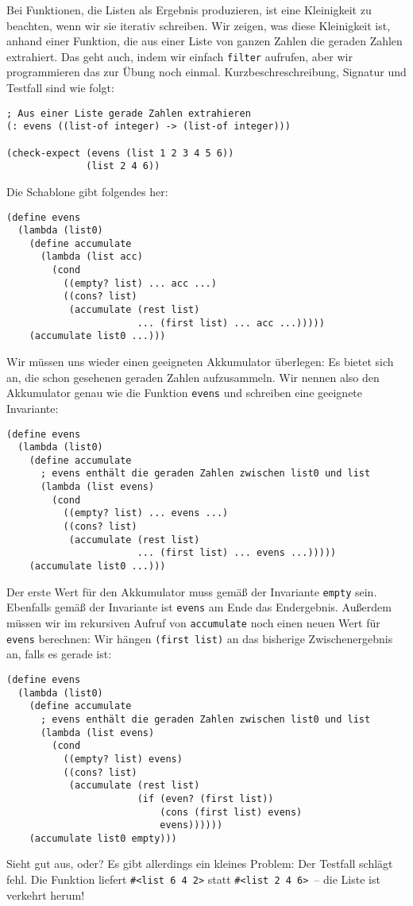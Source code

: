 Bei Funktionen, die Listen als Ergebnis produzieren, ist eine
Kleinigkeit zu beachten, wenn wir sie iterativ schreiben.  Wir zeigen,
was diese Kleinigkeit ist, anhand einer Funktion, die aus einer Liste
von ganzen Zahlen die geraden Zahlen extrahiert.  Das geht auch, indem
wir einfach \lstinline{filter} aufrufen, aber wir programmieren das
zur Übung noch einmal.  Kurzbeschreschreibung, Signatur und Testfall
sind wie folgt:
%
\begin{lstlisting}
; Aus einer Liste gerade Zahlen extrahieren
(: evens ((list-of integer) -> (list-of integer)))

(check-expect (evens (list 1 2 3 4 5 6))
              (list 2 4 6))
\end{lstlisting}
%
Die Schablone gibt folgendes her:
%
\begin{lstlisting}
(define evens
  (lambda (list0)
    (define accumulate
      (lambda (list acc)
        (cond
          ((empty? list) ... acc ...)
          ((cons? list)
           (accumulate (rest list)
                       ... (first list) ... acc ...)))))
    (accumulate list0 ...)))
\end{lstlisting}
%
Wir müssen uns wieder einen geeigneten Akkumulator überlegen: Es
bietet sich an, die schon gesehenen geraden Zahlen aufzusammeln.  Wir
nennen also den Akkumulator genau wie die Funktion \lstinline{evens}
und schreiben eine geeignete Invariante:
%
\begin{lstlisting}
(define evens
  (lambda (list0)
    (define accumulate
      ; evens enthält die geraden Zahlen zwischen list0 und list
      (lambda (list evens)
        (cond
          ((empty? list) ... evens ...)
          ((cons? list)
           (accumulate (rest list)
                       ... (first list) ... evens ...)))))
    (accumulate list0 ...)))
\end{lstlisting}
%
Der erste Wert für den Akkumulator muss gemäß der Invariante
\lstinline{empty} sein.  Ebenfalls gemäß der Invariante ist
\lstinline{evens} am Ende das Endergebnis.  Außerdem müssen wir im
rekursiven Aufruf von \lstinline{accumulate} noch einen neuen Wert für
\lstinline{evens} berechnen: Wir hängen \lstinline{(first list)} an
das bisherige Zwischenergebnis an, falls es gerade ist:\label{function:evens}
%
\begin{lstlisting}
(define evens
  (lambda (list0)
    (define accumulate
      ; evens enthält die geraden Zahlen zwischen list0 und list
      (lambda (list evens)
        (cond
          ((empty? list) evens)
          ((cons? list)
           (accumulate (rest list)
                       (if (even? (first list))
                           (cons (first list) evens)
                           evens))))))
    (accumulate list0 empty)))
\end{lstlisting}
%
Sieht gut aus, oder?  Es gibt allerdings ein kleines Problem: Der
Testfall schlägt fehl.  Die Funktion liefert \lstinline{#<list 6 4 2>}
statt \lstinline{#<list 2 4 6>}~-- die Liste ist verkehrt herum!

